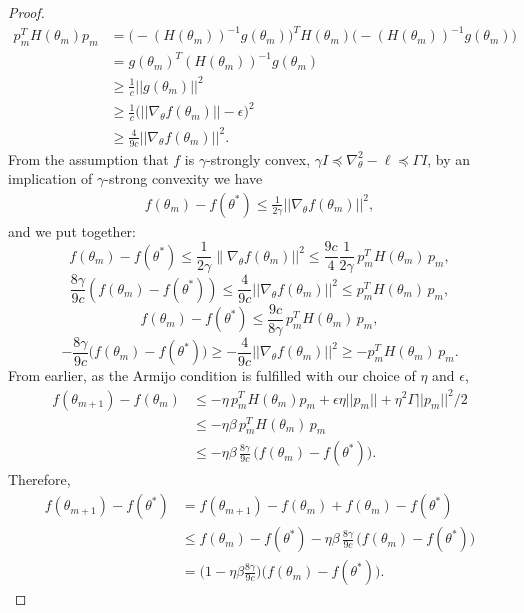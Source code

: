 \begin{proof}
\begin{align}
    p_m^TH(\theta_m)p_m &= \big(-(H(\theta_m))^{-1}g(\theta_m)\big)^TH(\theta_m)\big(-(H(\theta_m))^{-1}g(\theta_m)\big) \\
    &= g(\theta_m)^T(H(\theta_m))^{-1}g(\theta_m) \\
    &\geq \frac{1}{c}||g(\theta_m)||^2 \\
    &\geq \frac{1}{c}\big(||\nabla_\theta f(\theta_m)|| - \epsilon\big)^2 \\
    &\geq \frac{4}{9c}||\nabla_\theta f(\theta_m)||^2.
\end{align}
From the assumption that $f$ is $\gamma$-strongly convex, $\gamma I \preceq \nabla_\theta^2 -\ell \preceq \Gamma I$, by an implication of $\gamma$-strong convexity we have
\begin{align}
    f(\theta_m) - f(\theta^*) \leq \frac{1}{2\gamma}||\nabla_\theta f(\theta_m)||^2,
\end{align}
and we put together:
\begin{equation}
    f(\theta_m) - f(\theta^*) \leq \frac{1}{2\gamma}\big\|\nabla_\theta f(\theta_m)\big||^2 \leq \frac{9c}{4}\frac{1}{2\gamma}\, p_m^TH(\theta_m)\, p_m,
\end{equation}
\begin{equation}
    \frac{8\gamma}{9c}(f(\theta_m) - f(\theta^*)) \leq \frac{4}{9c}\big||\nabla_\theta f(\theta_m)\big||^2 \leq p_m^TH(\theta_m)\, p_m,
\end{equation}
\begin{equation}
    f(\theta_m) - f(\theta^*) \leq \frac{9c}{8\gamma}\, p_m^TH(\theta_m)\, p_m,
\end{equation}
\begin{equation}
    -\frac{8\gamma}{9c}\big(f(\theta_m) - f(\theta^*)\big) \geq -\frac{4}{9c}\big||\nabla_\theta f(\theta_m)\big||^2 \geq -p_m^TH(\theta_m)\, p_m.
\end{equation}
From earlier, as the Armijo condition is fulfilled with our choice of $\eta$ and $\epsilon$,
\begin{align}
    f(\theta_{m+1})-f(\theta_m) &\leq -\eta \, p_m^TH(\theta_m)p_m + \epsilon\eta||p_m|| + \eta^2 \Gamma ||p_m||^2 / 2 \\
    &\leq -\eta\beta \,  p_m^TH(\theta_m)\, p_m \\
    &\leq -\eta\beta \, \frac{8\gamma}{9c}\, \big(f(\theta_m) - f(\theta^*)\big).
\end{align}
Therefore,
\begin{align}
    f(\theta_{m+1}) - f(\theta^*) 
    &= f(\theta_{m+1})-f(\theta_m)+f(\theta_m)- f(\theta^*) \\
    &\leq f(\theta_m)- f(\theta^*) -\eta\beta\, \frac{8\gamma}{9c} \, \big(f(\theta_m) - f(\theta^*)\big) \\
    &= \Big(1-\eta\beta\frac{8\gamma}{9c}\Big)\big(f(\theta_m) - f(\theta^*)\big).
\end{align}

\end{proof}
